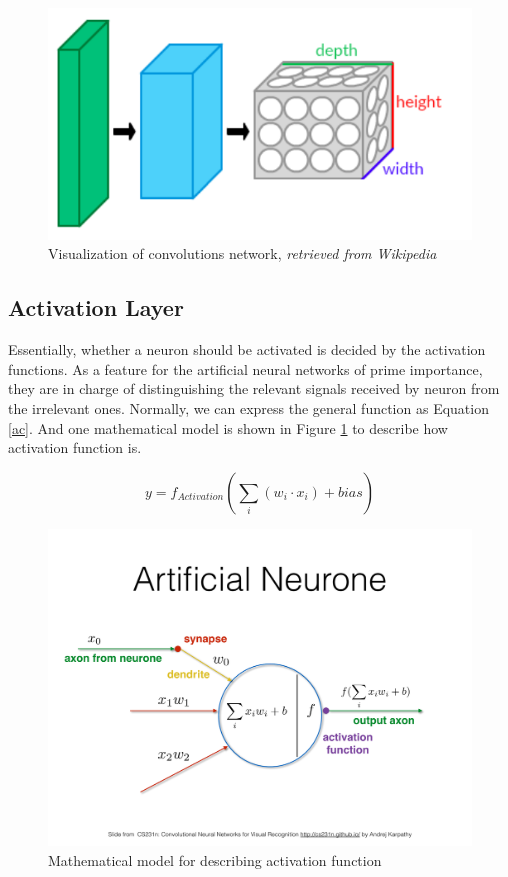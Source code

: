     \begin{figure}[!h]
        \centering
        \includegraphics[scale = 0.3]{Figures/Conv_layers.png}
        \caption{Visualization of convolutions network, \textit{retrieved from Wikipedia}}
    \end{figure}

    \subsection{Activation Layer}
    Essentially, whether a neuron should be activated is decided by the activation functions. As a feature for the artificial neural networks of prime importance, they are in charge of distinguishing the relevant signals received by neuron from the irrelevant ones. Normally, we can express the general function as Equation \ref{ac}. And one mathematical model is shown in Figure \ref{action} to describe how activation function is.

    \begin{equation}
        y = f_{Activation}(\sum_{i}(w_i \cdot x_i) + bias)
        \label{ac}
    \end{equation}

    \begin{figure}
        \centering
        \includegraphics[scale=0.3]{Figures/action.pdf}
        \caption{Mathematical model for describing activation function}
        \label{action}
    \end{figure}

